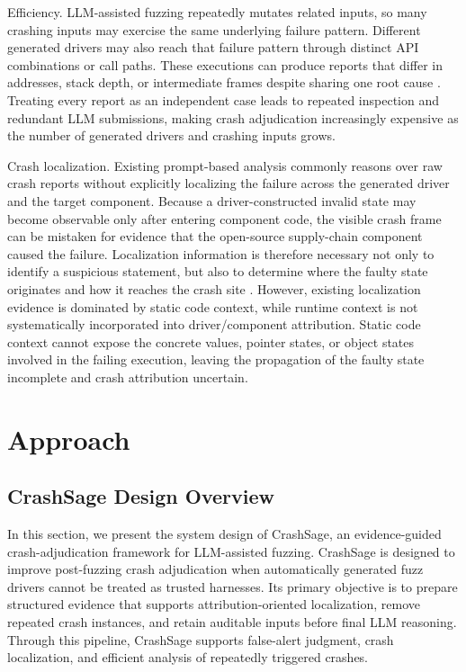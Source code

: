 \documentclass[pdflatex,sn-basic]{sn-jnl}%
\theoremstyle{thmstyleone}%
\theoremstyle{thmstyletwo}%
\theoremstyle{thmstylethree}%
\begin{document}
Efficiency. LLM-assisted fuzzing repeatedly mutates related inputs, so many crashing inputs may exercise the same underlying failure pattern. Different generated drivers may also reach that failure pattern through distinct API combinations or call paths. These executions can produce reports that differ in addresses, stack depth, or intermediate frames despite sharing one root cause \citep{ref21,ref22,ref25}. Treating every report as an independent case leads to repeated inspection and redundant LLM submissions, making crash adjudication increasingly expensive as the number of generated drivers and crashing inputs grows.

Crash localization. Existing prompt-based analysis commonly reasons over raw crash reports without explicitly localizing the failure across the generated driver and the target component. Because a driver-constructed invalid state may become observable only after entering component code, the visible crash frame can be mistaken for evidence that the open-source supply-chain component caused the failure. Localization information is therefore necessary not only to identify a suspicious statement, but also to determine where the faulty state originates and how it reaches the crash site \citep{ref14,ref15,ref20,ref23}. However, existing localization evidence is dominated by static code context, while runtime context is not systematically incorporated into driver/component attribution. Static code context cannot expose the concrete values, pointer states, or object states involved in the failing execution, leaving the propagation of the faulty state incomplete and crash attribution uncertain.


\section{Approach}
\label{sec:approach}

\subsection{CrashSage Design Overview}
\label{subsec:problem-overview}

In this section, we present the system design of CrashSage, an evidence-guided crash-adjudication framework for LLM-assisted fuzzing. CrashSage is designed to improve post-fuzzing crash adjudication when automatically generated fuzz drivers cannot be treated as trusted harnesses. Its primary objective is to prepare structured evidence that supports attribution-oriented localization, remove repeated crash instances, and retain auditable inputs before final LLM reasoning. Through this pipeline, CrashSage supports false-alert judgment, crash localization, and efficient analysis of repeatedly triggered crashes.
\end{document}
